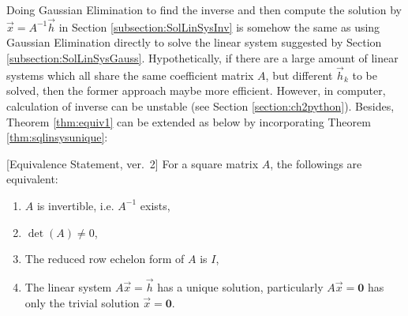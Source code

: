 Doing Gaussian Elimination to find the inverse and then compute the solution by $\vec{x} = A^{-1}\vec{h}$ in Section \ref{subsection:SolLinSysInv} is somehow the same as using Gaussian Elimination directly to solve the linear system suggested by Section \ref{subsection:SolLinSysGauss}. Hypothetically, if there are a large amount of linear systems which all share the same coefficient matrix $A$, but different $\vec{h}_k$ to be solved, then the former approach maybe more efficient. However, in computer, calculation of inverse can be unstable (see Section \ref{section:ch2python}). Besides, Theorem \ref{thm:equiv1} can be extended as below by incorporating Theorem \ref{thm:sqlinsysunique}:
\begin{thm}
\label{thm:equiv2}[Equivalence Statement, ver.\ 2]
For a square matrix $A$, the followings are equivalent:
\begin{enumerate}[label=(\alph*)]
\item $A$ is invertible, i.e. $A^{-1}$ exists,
\item $\det(A) \neq 0$,
\item The reduced row echelon form of $A$ is $I$,
\item The linear system $A\vec{x} = \vec{h}$ has a unique solution, particularly $A\vec{x} = \textbf{0}$ has only the trivial solution $\vec{x} = \textbf{0}$.
\end{enumerate}
\end{thm}

